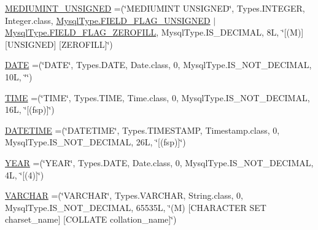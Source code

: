 \begin{DoxyCompactItemize}
\item 
\mbox{\hyperlink{enumcom_1_1mysql_1_1cj_1_1_mysql_type_a92af70931d9dd83d1457ba82ff3f46fc}{M\+E\+D\+I\+U\+M\+I\+N\+T\+\_\+\+U\+N\+S\+I\+G\+N\+ED}} =(\char`\"{}M\+E\+D\+I\+U\+M\+I\+NT U\+N\+S\+I\+G\+N\+ED\char`\"{}, Types.\+I\+N\+T\+E\+G\+ER, Integer.\+class, \mbox{\hyperlink{enumcom_1_1mysql_1_1cj_1_1_mysql_type_a2c6701614559b1ad9955cdc4ca6337e2}{Mysql\+Type.\+F\+I\+E\+L\+D\+\_\+\+F\+L\+A\+G\+\_\+\+U\+N\+S\+I\+G\+N\+ED}} $\vert$ \mbox{\hyperlink{enumcom_1_1mysql_1_1cj_1_1_mysql_type_abb76a1f2f3dac9a30d1b559b8ba66a48}{Mysql\+Type.\+F\+I\+E\+L\+D\+\_\+\+F\+L\+A\+G\+\_\+\+Z\+E\+R\+O\+F\+I\+LL}}, Mysql\+Type.\+I\+S\+\_\+\+D\+E\+C\+I\+M\+AL, 8\+L, \char`\"{}\mbox{[}(\+M)\mbox{]} \mbox{[}\+U\+N\+S\+I\+G\+N\+E\+D\mbox{]} \mbox{[}\+Z\+E\+R\+O\+F\+I\+L\+L\mbox{]}\char`\"{})
\item 
\mbox{\hyperlink{enumcom_1_1mysql_1_1cj_1_1_mysql_type_a27b01e95b5b669490e934d7484aa67eb}{D\+A\+TE}} =(\char`\"{}D\+A\+TE\char`\"{}, Types.\+D\+A\+TE, Date.\+class, 0, Mysql\+Type.\+I\+S\+\_\+\+N\+O\+T\+\_\+\+D\+E\+C\+I\+M\+AL, 10\+L, \char`\"{}\char`\"{})
\item 
\mbox{\hyperlink{enumcom_1_1mysql_1_1cj_1_1_mysql_type_a4f40234bb514d5564a25a6585bd8ab36}{T\+I\+ME}} =(\char`\"{}T\+I\+ME\char`\"{}, Types.\+T\+I\+ME, Time.\+class, 0, Mysql\+Type.\+I\+S\+\_\+\+N\+O\+T\+\_\+\+D\+E\+C\+I\+M\+AL, 16\+L, \char`\"{}\mbox{[}(fsp)\mbox{]}\char`\"{})
\item 
\mbox{\hyperlink{enumcom_1_1mysql_1_1cj_1_1_mysql_type_a10ab4319f5464017da0b6c5d8ba57840}{D\+A\+T\+E\+T\+I\+ME}} =(\char`\"{}D\+A\+T\+E\+T\+I\+ME\char`\"{}, Types.\+T\+I\+M\+E\+S\+T\+A\+MP, Timestamp.\+class, 0, Mysql\+Type.\+I\+S\+\_\+\+N\+O\+T\+\_\+\+D\+E\+C\+I\+M\+AL, 26\+L, \char`\"{}\mbox{[}(fsp)\mbox{]}\char`\"{})
\item 
\mbox{\hyperlink{enumcom_1_1mysql_1_1cj_1_1_mysql_type_a58de6bd3431bd81f859926ed489f19c1}{Y\+E\+AR}} =(\char`\"{}Y\+E\+AR\char`\"{}, Types.\+D\+A\+TE, Date.\+class, 0, Mysql\+Type.\+I\+S\+\_\+\+N\+O\+T\+\_\+\+D\+E\+C\+I\+M\+AL, 4\+L, \char`\"{}\mbox{[}(4)\mbox{]}\char`\"{})
\item 
\mbox{\hyperlink{enumcom_1_1mysql_1_1cj_1_1_mysql_type_a46a41a74f7598b207cfc15b8fdf3cd34}{V\+A\+R\+C\+H\+AR}} =(\char`\"{}V\+A\+R\+C\+H\+AR\char`\"{}, Types.\+V\+A\+R\+C\+H\+AR, String.\+class, 0, Mysql\+Type.\+I\+S\+\_\+\+N\+O\+T\+\_\+\+D\+E\+C\+I\+M\+AL, 65535\+L, \char`\"{}(\+M) \mbox{[}\+C\+H\+A\+R\+A\+C\+T\+E\+R S\+E\+T charset\+\_\+name\mbox{]} \mbox{[}\+C\+O\+L\+L\+A\+T\+E collation\+\_\+name\mbox{]}\char`\"{})

\end{DoxyCompactItemize}
